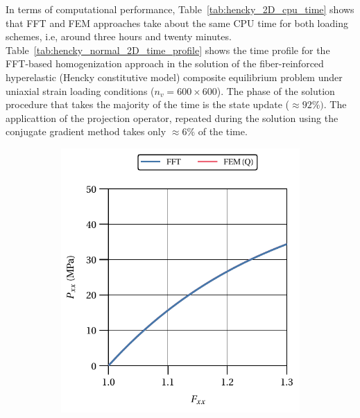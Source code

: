 In terms of computational performance, Table~\ref{tab:hencky_2D_cpu_time} shows that FFT and FEM approaches take about the same CPU time for both loading schemes, i.e, around three hours and twenty minutes.
Table~\ref{tab:hencky_normal_2D_time_profile} shows the time profile for the FFT-based homogenization approach in the solution of the fiber-reinforced hyperelastic (Hencky constitutive model) composite equilibrium problem under uniaxial strain loading conditions (\(n_v=600\times 600\)).
The phase of the solution procedure that takes the majority of the time is the state update (\(\approx 92\%)\).
The applicattion of the projection operator, repeated during the solution using the conjugate gradient method takes only \(\approx 6\%\) of the time.

\begin{figure}[hbt]
  \centering
	\begin{subfigure}[b]{0.49\textwidth}
    \centering
    \includegraphics[width=\textwidth]{figures/hencky_2D_normal_material_response}
    \caption{}
    \label{subfig:hencky_2D_normal_material_response}
  \end{subfigure}
  \begin{subfigure}[b]{0.49\textwidth}
    \centering

\end{subfigure}
\end{figure}
